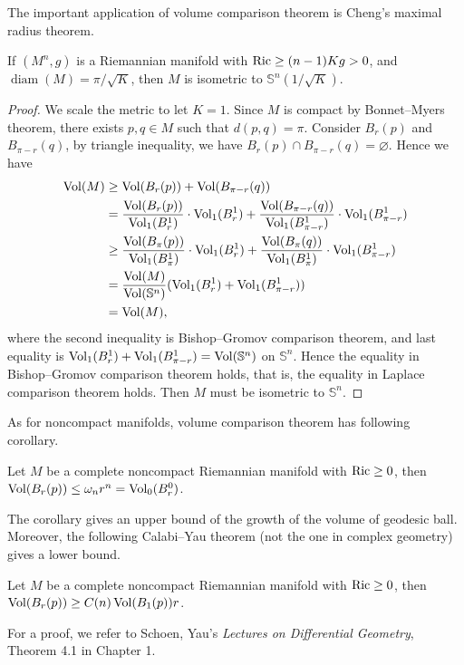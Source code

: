 The important application of volume comparison theorem is Cheng's maximal radius theorem.
\begin{thm}[Cheng]
    If $(M^n,g)$ is a Riemannian manifold with $\operatorname{Ric}\geq(n-1)Kg>0$, and $\operatorname{diam}(M)=\pi/\sqrt{K}$, then $M$ is isometric to $\mathbb{S}^n(1/\sqrt{K})$.
\end{thm}
\begin{proof}
    We scale the metric to let $K=1$.
    Since $M$ is compact by Bonnet--Myers theorem, there exists $p,q\in M$ such that $d(p,q)=\pi$.
    Consider $B_r(p)$ and $B_{\pi-r}(q)$, by triangle inequality, we have $B_r(p)\cap B_{\pi-r}(q)=\varnothing$.
    Hence we have
    \begin{align*}
        \operatorname{Vol}(M)&\geq\operatorname{Vol}(B_r(p))+\operatorname{Vol}(B_{\pi-r}(q))\\
        &=\frac{\operatorname{Vol}(B_r(p))}{\operatorname{Vol}_1(B_r^1)}\cdot\operatorname{Vol}_1(B_r^1)+\frac{\operatorname{Vol}(B_{\pi-r}(q))}{\operatorname{Vol}_1(B_{\pi-r}^1)}\cdot\operatorname{Vol}_1(B_{\pi-r}^1)\\
        &\geq\frac{\operatorname{Vol}(B_\pi(p))}{\operatorname{Vol}_1(B_\pi^1)}\cdot\operatorname{Vol}_1(B_r^1)+\frac{\operatorname{Vol}(B_\pi(q))}{\operatorname{Vol}_1(B_\pi^1)}\cdot\operatorname{Vol}_1(B_{\pi-r}^1)\\
        &=\frac{\operatorname{Vol}(M)}{\operatorname{Vol}(\mathbb{S}^n)}(\operatorname{Vol}_1(B_r^1)+\operatorname{Vol}_1(B_{\pi-r}^1))\\
        &=\operatorname{Vol}(M),
    \end{align*}
    where the second inequality is Bishop--Gromov comparison theorem, and last equality is $\operatorname{Vol}_1(B_r^1)+\operatorname{Vol}_1(B_{\pi-r}^1)=\operatorname{Vol}(\mathbb{S}^n)$ on $\mathbb{S}^n$.
    Hence the equality in Bishop--Gromov comparison theorem holds, that is, the equality in Laplace comparison theorem holds.
    Then $M$ must be isometric to $\mathbb{S}^n$.
\end{proof}

As for noncompact manifolds, volume comparison theorem has following corollary.

\begin{cor}
    Let $M$ be a complete noncompact Riemannian manifold with $\operatorname{Ric}\geq 0$, then $\operatorname{Vol}(B_r(p))\leq\omega_nr^n=\operatorname{Vol}_0(B_r^0)$.
\end{cor}

The corollary gives an upper bound of the growth of the volume of geodesic ball.
Moreover, the following Calabi--Yau theorem (not the one in complex geometry) gives a lower bound.
\begin{thm}
    Let $M$ be a complete noncompact Riemannian manifold with $\operatorname{Ric}\geq 0$, then $\operatorname{Vol}(B_r(p))\geq C(n)\operatorname{Vol}(B_1(p))r$.
\end{thm}
For a proof, we refer to Schoen, Yau's \emph{Lectures on Differential Geometry}, Theorem 4.1 in Chapter 1.